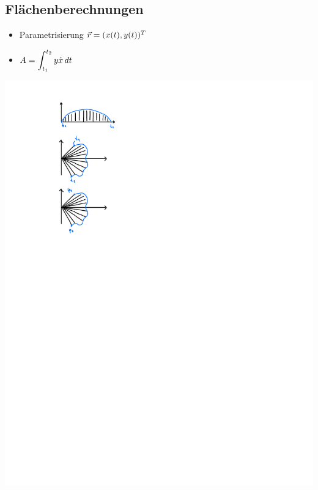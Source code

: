 \subsection{Flächenberechnungen}
    \vspace{0.5em}
    \begin{itemize}
        \item Parametrisierung $\vec{r}=(x(t),y(t))^T$ \hfill
    \end{itemize}
    \begin{minipage}{0.65\linewidth}
        \vspace{-1em}
        \begin{itemize}
        \item[]  $\displaystyle A= \int_{t_1}^{t_2} y \dot{x} \, dt$
        \end{itemize}
    \end{minipage}
    \begin{minipage}{0.34\linewidth}
        \includegraphics[width=0.7\linewidth]{src/Integralrechnung/param.pdf}
    \end{minipage}

